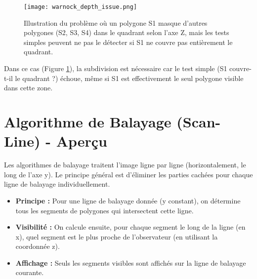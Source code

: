\documentclass{article}
\begin{document}
\begin{figure}[H]
\centering
\texttt{[image: warnock\_depth\_issue.png]}
\caption{Illustration du problème où un polygone S1 masque d'autres polygones (S2, S3, S4) dans le quadrant selon l'axe Z, mais les tests simples peuvent ne pas le détecter si S1 ne couvre pas entièrement le quadrant.}
\label{fig:warnock_depth_issue}
\end{figure}

Dans ce cas (Figure \ref{fig:warnock_depth_issue}), la subdivision est nécessaire car le test simple (S1 couvre-t-il le quadrant ?) échoue, même si S1 est effectivement le seul polygone visible dans cette zone.

\section{Algorithme de Balayage (Scan-Line) - Aperçu}

Les algorithmes de balayage traitent l'image ligne par ligne (horizontalement, le long de l'axe y). Le principe général est d'éliminer les parties cachées pour chaque ligne de balayage individuellement.

\begin{itemize}
    \item \textbf{Principe :} Pour une ligne de balayage donnée (y constant), on détermine tous les segments de polygones qui intersectent cette ligne.
    \item \textbf{Visibilité :} On calcule ensuite, pour chaque segment le long de la ligne (en x), quel segment est le plus proche de l'observateur (en utilisant la coordonnée z).
    \item \textbf{Affichage :} Seuls les segments visibles sont affichés sur la ligne de balayage courante.
\end{itemize}
\end{document}
